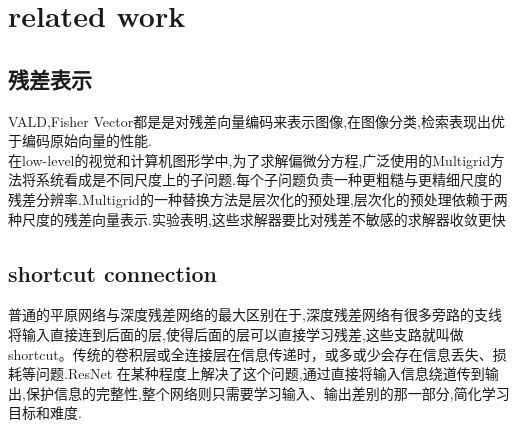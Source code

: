 \documentclass[12pt]{ctexart}%
\begin{document}
	\section{\quad related work}
		\subsection{\quad 残差表示}
			VALD,Fisher Vector都是是对残差向量编码来表示图像,在图像分类,检索表现出优于编码原始向量的性能.\\
			在low-level的视觉和计算机图形学中,为了求解偏微分方程,广泛使用的Multigrid方法将系统看成是不同尺度上的子问题.每个子问题负责一种更粗糙与更精细尺度的残差分辨率.Multigrid的一种替换方法是层次化的预处理,层次化的预处理依赖于两种尺度的残差向量表示.实验表明,这些求解器要比对残差不敏感的求解器收敛更快

		\subsection{\quad shortcut connection}
			普通的平原网络与深度残差网络的最大区别在于,深度残差网络有很多旁路的支线将输入直接连到后面的层,使得后面的层可以直接学习残差,这些支路就叫做shortcut。传统的卷积层或全连接层在信息传递时，或多或少会存在信息丢失、损耗等问题.ResNet 在某种程度上解决了这个问题,通过直接将输入信息绕道传到输出,保护信息的完整性,整个网络则只需要学习输入、输出差别的那一部分,简化学习目标和难度.
\end{document}
